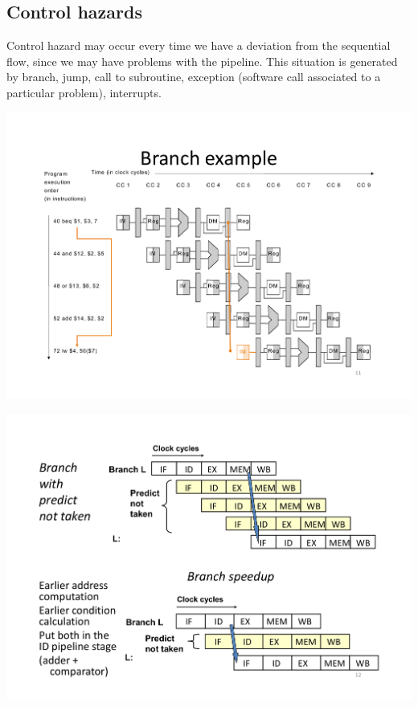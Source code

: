 
\subsection{Control hazards}
Control hazard may occur every time we have a deviation from the sequential
flow, since we may have problems with the pipeline. This situation is generated
by branch, jump, call to subroutine, exception (software call associated to a
particular problem), interrupts.

\begin{center}
  \includegraphics[width=0.9\linewidth]{img/img3/mips8}
\end{center}
\begin{center}
  \includegraphics[width=0.9\linewidth]{img/img3/mips9}
\end{center}

